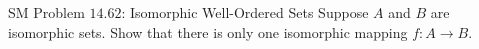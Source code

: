 
\begin{frame}{}
  \begin{exampleblock}{SM Problem $14.62$: Isomorphic Well-Ordered Sets}
    Suppose $A$ and $B$ are  isomorphic sets.
    Show that there is only one isomorphic mapping $f: A \to B$.
  \end{exampleblock}
\end{frame}

\begin{frame}{}
  \begin{exampleblock}{}
  \end{exampleblock}
\end{frame}

\begin{frame}{}
  \begin{exampleblock}{}
  \end{exampleblock}
\end{frame}

\begin{frame}{}
  \begin{exampleblock}{}
  \end{exampleblock}
\end{frame}

\begin{frame}{}
  \begin{exampleblock}{}
  \end{exampleblock}
\end{frame}

